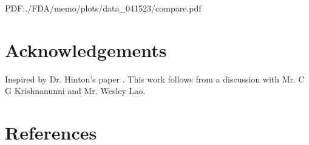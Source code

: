 \documentclass[12pt]{iopart}
\theoremstyle{break}
\begin{document}
PDF:./FDA/memo/plots/data_041523/compare.pdf
	
% 
	
\section{Acknowledgements}
Inspired by Dr. Hinton's paper \cite{FFA23}.
This work follows from a discussion with Mr. C G Krishnanunni and Mr. Wesley Lao.
\section{References}

\end{document}
